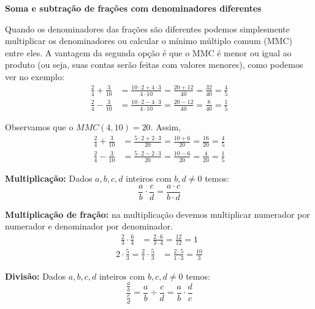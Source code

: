  \begin{exem}
 \textbf{Soma e subtração de frações com denominadores diferentes}

   Quando os denominadores das frações são diferentes podemos simplesmente multiplicar os denominadores ou calcular o mínimo múltiplo comum (MMC) entre eles. A vantagem da segunda opção é que o MMC é menor ou igual ao produto (ou seja, suas contas serão feitas com valores menores), como podemos ver no exemplo:
\begin{align*}
\frac{2}{4} + \frac{3}{10} &= \frac{10 \cdot 2 + 4 \cdot 3}{4 \cdot 10}= \frac{20 + 12}{40}= \frac{32}{40}= \frac{4}{5}\\[10pt]
\frac{2}{4} - \frac{3}{10} &= \frac{10 \cdot 2 - 4 \cdot 3}{4 \cdot 10}= \frac{20 - 12}{40}= \frac{8}{40}= \frac{1}{5}
\end{align*}

   Observamos que o $MMC(4, 10)= 20$. Assim,
\begin{align*}
\frac{2}{4} + \frac{3}{10} &= \frac{5 \cdot 2 + 2 \cdot 3}{20}= \frac{10+6}{20}= \frac{16}{20}=\frac{4}{5}\\[10pt]
\frac{2}{4} - \frac{3}{10} &= \frac{5 \cdot 2 - 2 \cdot 3}{20}= \frac{10 - 6}{20}= \frac{4}{20}=\frac{1}{5}
\end{align*}
 \end{exem}

\begin{obs}
  \textbf{Multiplicação:} Dados $a, b, c, d$ inteiros com $b, d \neq 0$ temos:
\begin{equation*}
\frac{a}{b} \cdot \frac{c}{d}= \frac{a \cdot c}{b \cdot d} 
\end{equation*}
\end{obs}

 \begin{exem}
  \textbf{Multiplicação de fração:} na multiplicação devemos multiplicar numerador por numerador e denominador por denominador.
\begin{align*}
\frac{2}{3} \cdot \frac{6}{4} &= \frac{2 \cdot 6}{3 \cdot 4}= \frac{12}{12}= 1 \end{align*} 
\begin{align*}
2 \cdot \frac{5}{3} = \frac{2}{1} \cdot \frac{5}{3}  &= \frac{2 \cdot 5}{1 \cdot 3}= \frac{10}{3}
\end{align*}
 \end{exem}

\begin{obs}
  \textbf{Divisão:} Dados $a, b, c, d$ inteiros com $b, c, d \neq 0$ temos:
\begin{equation*}
\displaystyle \frac{\frac{a}{b}}{\frac{c}{d}} =  \frac{a}{b} \div \frac{c}{d}= \frac{a}{b} \cdot \frac{d}{c} 
\end{equation*}
\end{obs}

